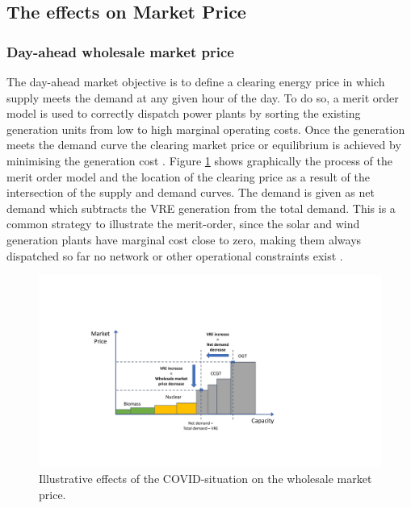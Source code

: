 \documentclass[energies,article,submit,moreauthors,pdftex]{Definitions/mdpi}
\begin{document}

\subsection{The effects on Market Price}\label{section:Market price}

\subsubsection{Day-ahead wholesale market price}\label{sec:day-ahead wholesale market price}

The day-ahead market objective is to define a clearing energy price in which supply meets the demand at any given hour of the day. To do so, a merit order model is used to correctly dispatch power plants by sorting the existing generation units from low to high marginal operating costs. Once the generation meets the demand curve the clearing market price or equilibrium is achieved by minimising the generation cost \cite{Maekawa2018TheExchange}. Figure \ref{fig:wholesale-market-effects} shows graphically the process of the merit order model and the location of the clearing price as a result of the intersection of the supply and demand curves. The demand is given as net demand which subtracts the VRE generation from the total demand. This is a common strategy to illustrate the merit-order, since the solar and wind generation plants have marginal cost close to zero, making them always dispatched so far no network or other operational constraints exist \cite{Hirth2014TheVariability}. 

\begin{figure}[H]
\centering
\hspace{-25pt}
\includegraphics[trim={5cm 3cm 10cm 4.5cm},clip,width=13cm]{Graphics/Wholesale-market-price.pdf}
\caption{Illustrative effects of the COVID-situation on the wholesale market price.}
\label{fig:wholesale-market-effects}
\end{figure} 
\end{document}
